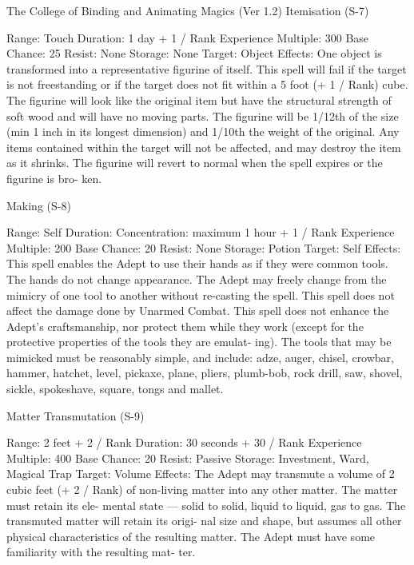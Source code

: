 \begin{Chapter}{The College of Binding and Animating Magics (Ver 1.2)}
Itemisation (S-7) 

Range: Touch 
Duration: 1 day + 1 / Rank 
Experience Multiple: 300 
Base Chance: 25%
Resist: None 
Storage: None 
Target: Object 
Effects: One object is transformed into a representative  figurine  of  itself.  This  spell  will  fail  if  the 
target is not freestanding or if the target does not fit 
within a 5 foot (+ 1 / Rank) cube. The figurine will 
look  like  the  original  item  but  have  the  structural 
strength  of  soft  wood  and  will  have  no  moving 
parts. The figurine will be 1/12th of the size (min 1 
inch  in  its  longest  dimension)  and  1/10th  the 
weight of the original. Any items contained within 
the target will not be affected, and may destroy the 
item  as  it  shrinks.  The  figurine  will  revert  to  normal  when  the  spell  expires  or  the  figurine  is  bro-
ken. 

Making (S-8) 

Range: Self 
Duration:  Concentration:  maximum  1  hour  +  1  / 
Rank 
Experience Multiple: 200 
Base Chance: 20%
Resist: None 
Storage: Potion 
Target: Self 
Effects:  This  spell  enables  the  Adept  to  use  their 
hands as if they were common tools. The hands do 
not  change  appearance.  The  Adept  may  freely 
change  from  the  mimicry  of  one  tool  to  another 
without  re-casting  the  spell.  This  spell  does  not 
affect the damage done by Unarmed Combat. This 
spell  does  not  enhance  the  Adept’s  craftsmanship, 
nor  protect  them  while  they  work  (except  for  the 
protective  properties  of  the  tools  they  are  emulat-
ing).  The  tools  that  may  be  mimicked  must  be 
reasonably simple, and include: adze, auger, chisel, 
crowbar,  hammer,  hatchet,  level,  pickaxe,  plane, 
pliers,  plumb-bob,  rock  drill,  saw,  shovel,  sickle, 
spokeshave, square, tongs and mallet. 

Matter Transmutation (S-9) 

Range: 2 feet + 2 / Rank 
Duration: 30 seconds + 30 / Rank 
Experience Multiple: 400 
Base Chance: 20%
Resist: Passive 
Storage: Investment, Ward, Magical Trap 
Target: Volume 
Effects:  The  Adept  may  transmute  a  volume  of  2 
cubic  feet  (+  2  /  Rank)  of  non-living  matter  into 
any  other  matter.  The  matter  must  retain  its  ele-
mental  state  —  solid  to  solid,  liquid to  liquid,  gas 
to  gas.  The  transmuted  matter  will  retain its  origi-
nal  size  and  shape,  but  assumes  all  other  physical 
characteristics  of  the  resulting  matter.  The  Adept 
must have some familiarity with the resulting mat-
ter. 


\end{Chapter}
